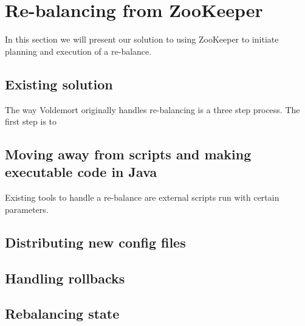 \section{Re-balancing from ZooKeeper}
In this section we will present our solution to using ZooKeeper to initiate planning and execution of a re-balance. 

\subsection{Existing solution}
The way Voldemort originally handles re-balancing is a three step process. The first step is to 

\subsection{Moving away from scripts and making executable code in Java}
Existing tools to handle a re-balance are external scripts run with certain parameters. 

\subsection{Distributing new config files}

\subsection{Handling rollbacks}

\subsection{Rebalancing state}